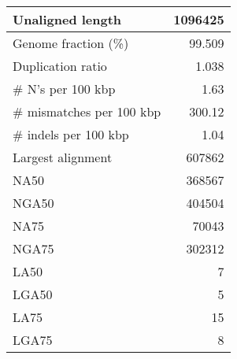 \documentclass[12pt,a4paper]{article}
\begin{document}
\begin{table}[ht]
\begin{center}
\begin{tabular}{|l*{1}{|r}|}
Unaligned length & 1096425 \\ \hline
Genome fraction (\%) & 99.509 \\ \hline
Duplication ratio & 1.038 \\ \hline
\# N's per 100 kbp & 1.63 \\ \hline
\# mismatches per 100 kbp & 300.12 \\ \hline
\# indels per 100 kbp & 1.04 \\ \hline
Largest alignment & 607862 \\ \hline
NA50 & 368567 \\ \hline
NGA50 & 404504 \\ \hline
NA75 & 70043 \\ \hline
NGA75 & 302312 \\ \hline
LA50 & 7 \\ \hline
LGA50 & 5 \\ \hline
LA75 & 15 \\ \hline
LGA75 & 8 \\ \hline
\end{tabular}
\end{center}
\end{table}
\end{document}
